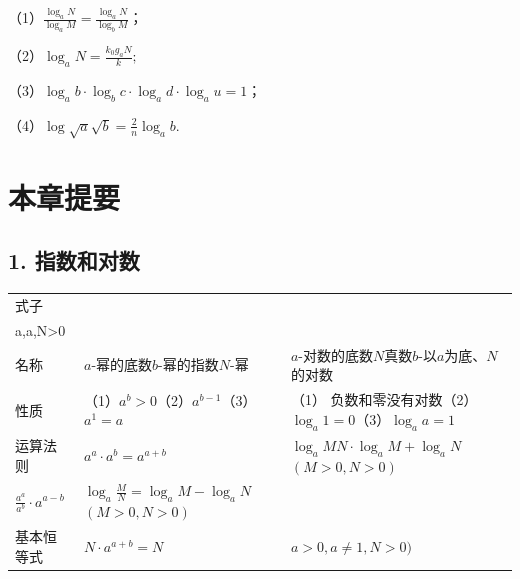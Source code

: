 （1）\(\frac{\log_a N}{\log_a M} = \frac{\log_a N}{\log_b M}\)；

（2）\(\log_{a}N = \frac{k_{0}g_{a}N}{k};\)

（3）\(\log_a b \cdot \log_b c \cdot \log_a d \cdot \log_a u = 1\)；

（4）\(\log \sqrt{a} \sqrt{b} = \frac{2}{n} \log_a b.\)

\section{本章提要}

\subsection{1. 指数和对数}

{\def\LTcaptype{none}%
\footnotesize\setlength{\tabcolsep}{3pt}%
\begin{longtable}[]{@{}
  >{\raggedright\arraybackslash}p{}
  >{\raggedright\arraybackslash}p{}
  >{\raggedright\arraybackslash}p{}@{}}
\toprule\noalign{}
\begin{minipage}[b]{\linewidth}\raggedright
式子
\end{minipage} & \begin{minipage}[b]{\linewidth}\raggedright
\(a^{b}=N\)\((a>0,a\neq1)\)\(\Longleftrightarrow\)\(\begin{array}{l}1\cdot g_{a}N=b \\ a\cdot 0,a\neq1,N>0\end{array}\)
\end{minipage} & \begin{minipage}[b]{\linewidth}\raggedright
\end{minipage} \\
\midrule\noalign{}
\endhead
\bottomrule\noalign{}
\endlastfoot
名称 & \(a\)-幂的底数\(b\)-幂的指数\(N\)-幂 &
\(a\)-对数的底数\(N\)真数\(b\)-以\(a\)为底、\(N\)的对数 \\
性质 & （1）\(a^{b}>0\)（2）\(a^{b-1}\)（3）\(a^{1}=a\) & （1）
负数和零没有对数（2）\(\log_{a}1=0\)（3）\(\log_{a}a=1\) \\
运算法则 & \(a^{a} \cdot a^{b}=a^{a+b}\) &
\(\log_{a}M N \cdot \log_{a}M+\log_{a}N\)\((M>0, N>0)\) \\
\(\frac{a^{a}}{a^{b}} \cdot a^{a-b}\) &
\(\log_{a}\frac{M}{N}=\log_{a}M-\log_{a}N\)\((M>0, N>0)\) & \\
基本恒等式 & \(N \cdot a^{a+b} = N\) & \(a>0, a \neq 1, N>0)\) \\
\end{longtable}
}

